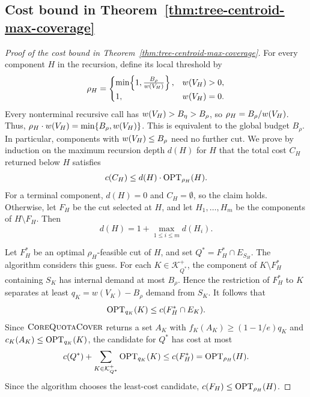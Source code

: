 \subsection{Cost bound in Theorem~\ref{thm:tree-centroid-max-coverage}}\label{app:tree-centroid-max-coverage-cost}
\begin{proof}[Proof of the cost bound in Theorem~\ref{thm:tree-centroid-max-coverage}]
For every component $H$ in the recursion, define its local threshold by
\[
    \rho_H=
    \begin{cases}
        \min\mathopen{}\left\{ 1,\frac{B_\rho}{w\mathopen{}\left( V_H \right)} \right\}, & w\mathopen{}\left( V_H \right)>0,\\
        1, & w\mathopen{}\left( V_H \right)=0.
    \end{cases}
\]
Every nonterminal recursive call has $w\mathopen{}\left( V_H \right)>B_\eta>B_\rho$, so $\rho_H=B_\rho/w\mathopen{}\left( V_H \right)$. Thus, $\rho_H\cdot w\mathopen{}\left( V_H \right)=\min\mathopen{}\left\{ B_\rho,w\mathopen{}\left( V_H \right) \right\}$. This is equivalent to the global budget $B_\rho$. In particular, components with $w\mathopen{}\left( V_H \right)\leq B_\rho$ need no further cut. We prove by induction on the maximum recursion depth $d(H)$ for $H$ that the total cost $C_H$ returned below $H$ satisfies
\[
    c(C_H)\leq d(H)\cdot\textup{OPT}_{\rho_H}(H).
\]
For a terminal component, $d(H)=0$ and $C_H=\emptyset$, so the claim holds. Otherwise, let $F_H$ be the cut selected at $H$, and let $H_1,\ldots,H_m$ be the components of $H\setminus F_H$. Then
\[
    d(H)=1+\max_{1\leq i\leq m}d(H_i).
\]

Let $F_H^*$ be an optimal $\rho_H$-feasible cut of $H$, and set $Q^*=F_H^*\cap E_{S_H}$. The algorithm considers this guess. For each $K\in\mathcal K_{Q^*}^+$, the component of $K\setminus F_H^*$ containing $S_K$ has internal demand at most $B_\rho$. Hence the restriction of $F_H^*$ to $K$ separates at least $q_K=w(V_K)-B_\rho$ demand from $S_K$. It follows that
\[
    \textup{OPT}_{q_K}(K)\leq c(F_H^*\cap E_K).
\]
Since $\textsc{CoreQuotaCover}$ returns a set $A_K$ with $f_K(A_K)\geq(1-1/e)q_K$ and $c_K(A_K)\leq\textup{OPT}_{q_K}(K)$, the candidate for $Q^*$ has cost at most
\[
    c(Q^*)+\sum_{K\in\mathcal K_{Q^*}^+}\textup{OPT}_{q_K}(K)
    \leq c(F_H^*)=\textup{OPT}_{\rho_H}(H).
\]
Since the algorithm chooses the least-cost candidate, $c(F_H)\leq\textup{OPT}_{\rho_H}(H)$.


\end{proof}
